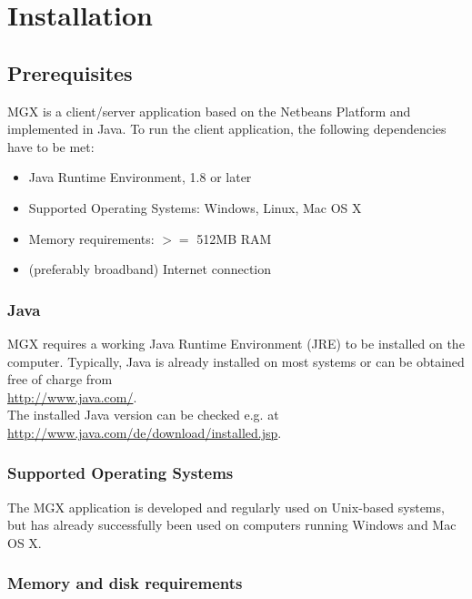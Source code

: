 
\chapter{Installation}
\label{installation}

\section{Prerequisites}

MGX is a client/server application based on the Netbeans Platform and implemented
in Java. To run the client application, the following dependencies have to be
met:

\begin{itemize}
  \item{Java Runtime Environment, 1.8 or later}
  \item{Supported Operating Systems: Windows, Linux, Mac OS X}
  \item{Memory requirements: $>=$ 512MB RAM}
  \item{(preferably broadband) Internet connection}
\end{itemize}

\subsection{Java}

MGX requires a working Java Runtime Environment (JRE) to be installed on the computer. Typically,
Java is already installed on most systems or can be obtained free of charge from\\

\url{http://www.java.com/}.\\

The installed Java version can be checked e.g. at\\

\url{http://www.java.com/de/download/installed.jsp}.

\subsection{Supported Operating Systems}

The MGX application is developed and regularly used on Unix-based systems,
but has already successfully been used on computers running Windows and
Mac OS X.

\subsection{Memory and disk requirements}

